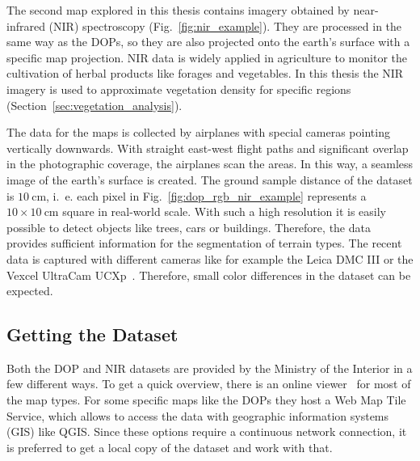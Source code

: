 The second map explored in this thesis contains imagery obtained by near-infrared (NIR) spectroscopy (Fig.~\ref{fig:nir_example}). They are processed in the same way as the DOPs, so they are also projected onto the earth's surface with a specific map projection. NIR data is widely applied in agriculture to monitor the cultivation of herbal products like forages and vegetables. In this thesis the NIR imagery is used to approximate vegetation density for specific regions (Section~\ref{sec:vegetation_analysis}).

The data for the maps is collected by airplanes with special cameras pointing vertically downwards. With straight east-west flight paths and significant overlap in the photographic coverage, the airplanes scan the areas. In this way, a seamless image of the earth's surface is created. The ground sample distance of the dataset is $10~\text{cm}$, i.~e. each pixel in Fig.~\ref{fig:dop_rgb_nir_example} represents a $10\times 10~\text{cm}$ square in real-world scale. With such a high resolution it is easily possible to detect objects like trees, cars or buildings. Therefore, the data provides sufficient information for the segmentation of terrain types. The recent data is captured with different cameras like for example the Leica DMC III or the Vexcel UltraCam UCXp~\cite{topo-image16}. Therefore, small color differences in the dataset can be expected.

\subsection{Getting the Dataset}
Both the DOP and NIR datasets are provided by the Ministry of the Interior in a few different ways. To get a quick overview, there is an online viewer~\cite{tim_online20} for most of the map types. For some specific maps like the DOPs they host a Web Map Tile Service, which allows to access the data with geographic information systems (GIS) like QGIS. Since these options require a continuous network connection, it is preferred to get a local copy of the dataset and work with that.

